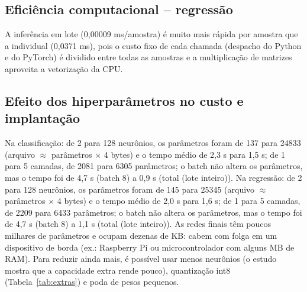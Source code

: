 \documentclass[11pt,a4paper]{article}
\begin{document}
\subsection{Eficiência computacional -- regressão}
\begin{table}[H]\centering\scriptsize{}
\caption{Eficiência (regressão). Energia estimada como potência assumida (15 W) $\times$ tempo; CO$_2$ = kWh $\times$ 45,8 g/kWh (fator do Brasil, Aula 08).}\label{tab:ef_reg}\end{table}
A inferência em lote (0,00009 ms/amostra) é muito mais rápida por amostra que a individual (0,0371 ms), pois o custo fixo de cada chamada (despacho do Python e do PyTorch) é dividido entre todas as amostras e a multiplicação de matrizes aproveita a vetorização da CPU.


\subsection{Efeito dos hiperparâmetros no custo e implantação}
Na classificação: de 2 para 128 neurônios, os parâmetros foram de 137 para 24833 (arquivo $\approx$ parâmetros $\times$ 4 bytes) e o tempo médio de 2,3 s para 1,5 s; de 1 para 5 camadas, de 2081 para 6305 parâmetros; o batch não altera os parâmetros, mas o tempo foi de 4,7 s (batch 8) a 0,9 s (total (lote inteiro)). Na regressão: de 2 para 128 neurônios, os parâmetros foram de 145 para 25345 (arquivo $\approx$ parâmetros $\times$ 4 bytes) e o tempo médio de 2,0 s para 1,6 s; de 1 para 5 camadas, de 2209 para 6433 parâmetros; o batch não altera os parâmetros, mas o tempo foi de 4,7 s (batch 8) a 1,1 s (total (lote inteiro)). 
As redes finais têm poucos milhares de parâmetros e ocupam dezenas de KB: cabem com folga em um dispositivo de borda (ex.: Raspberry Pi
ou microcontrolador com alguns MB de RAM). Para reduzir ainda mais, é possível usar menos neurônios (o estudo mostra que a capacidade
extra rende pouco), quantização int8 (Tabela~\ref{tab:extras}) e poda de pesos pequenos. %
\end{document}
